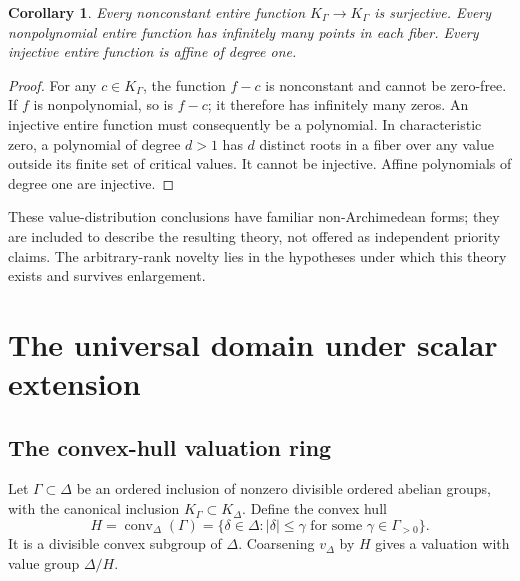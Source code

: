 \documentclass[11pt,letterpaper]{article}
\numberwithin{equation}{section}
\newtheorem{corollary}[theorem]{Corollary}
\theoremstyle{definition}
\theoremstyle{remark}
\begin{document}
\begin{corollary}\label{cor:fibers}
Every nonconstant entire function $K_\Gamma\to K_\Gamma$ is surjective.
Every nonpolynomial entire function has infinitely many points in each fiber.
Every injective entire function is affine of degree one.
\end{corollary}
\begin{proof}
For any $c\in K_\Gamma$, the function $f-c$ is nonconstant and cannot be
zero-free. If $f$ is nonpolynomial, so is $f-c$; it therefore has infinitely
many zeros. An injective entire function must consequently be a polynomial.
In characteristic zero, a polynomial of degree $d>1$ has $d$ distinct roots
in a fiber over any value outside its finite set of critical values. It
cannot be injective. Affine polynomials of degree one are injective.
\end{proof}

These value-distribution conclusions have familiar non-Archimedean forms;
they are included to describe the resulting theory, not offered as independent
priority claims. The arbitrary-rank novelty lies in the hypotheses under which
this theory exists and survives enlargement.

\section{The universal domain under scalar extension}\label{sec:extension}

\subsection{The convex-hull valuation ring}
Let $\Gamma\subset\Delta$ be an ordered inclusion of nonzero divisible
ordered abelian groups, with the canonical inclusion
$K_\Gamma\subset K_\Delta$. Define the convex hull
\begin{equation}\label{eq:convex-hull}
 H=\operatorname{conv}_\Delta(\Gamma)
 =\{\delta\in\Delta:|\delta|\le\gamma
                      \text{ for some }\gamma\in\Gamma_{>0}\}.
\end{equation}
It is a divisible convex subgroup of $\Delta$. Coarsening $v_\Delta$ by $H$
gives a valuation with value group $\Delta/H$.
\end{document}
